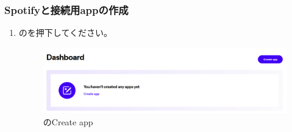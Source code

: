         \subsubsection{Spotifyと\bj 接続用appの作成}
        \label{sec:spotify4}
            \begin{enumerate}
                \item \spotifydashboard のを押下してください。
                \label{item:spotify6}
                    \begin{figure}[htbp]
                        \centering
                        \includegraphics[width=\linewidth]{./pictures/Spotify5.png}
                        \caption{\spotifydashboard のCreate app}
                        \label{img:spotify5}
                    \end{figure}


\end{enumerate}
